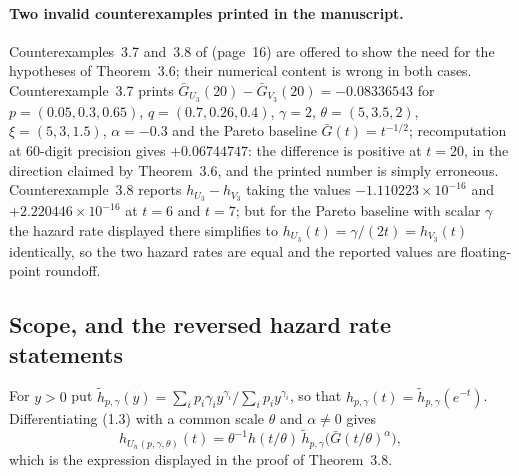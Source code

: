 \documentclass[10pt]{article}
\theoremstyle{plain}
\theoremstyle{definition}
\theoremstyle{remark}
\begin{document}
\paragraph{Two invalid counterexamples printed in the manuscript.} Counterexamples~3.7 and~3.8 of \cite{SahooKayalFinkelstein2026} (page~16) are offered to show the need for the hypotheses of Theorem~3.6; their numerical content is wrong in both cases. Counterexample~3.7 prints $\bar G_{U_3}(20)-\bar G_{V_3}(20)=-0.08336543$ for $p=(0.05,0.3,0.65)$, $q=(0.7,0.26,0.4)$, $\gamma=2$, $\theta=(5,3.5,2)$, $\xi=(5,3,1.5)$, $\alpha=-0.3$ and the Pareto baseline $\bar G(t)=t^{-1/2}$; recomputation at $60$-digit precision gives $+0.06744747$: the difference is positive at $t=20$, in the direction claimed by Theorem~3.6, and the printed number is simply erroneous. Counterexample~3.8 reports $h_{U_3}-h_{V_3}$ taking the values $-1.110223\times10^{-16}$ and $+2.220446\times10^{-16}$ at $t=6$ and $t=7$; but for the Pareto baseline with scalar $\gamma$ the hazard rate displayed there simplifies to $h_{U_3}(t)=\gamma/(2t)=h_{V_3}(t)$ identically, so the two hazard rates are equal and the reported values are floating-point roundoff.

\subsection{Scope, and the reversed hazard rate statements}\label{sec:rh}

For $y>0$ put $\tilde h_{p,\gamma}(y)=\sum_ip_i\gamma_iy^{\gamma_i}/\sum_ip_iy^{\gamma_i}$, so that $h_{p,\gamma}(t)=\tilde h_{p,\gamma}(e^{-t})$. Differentiating (1.3) with a common scale $\theta$ and $\alpha\ne0$ gives
\begin{equation}\label{eq:reduction}
h_{U_n(p,\gamma,\theta)}(t)=\theta^{-1}h(t/\theta)\,\tilde h_{p,\gamma}\bigl(\bar G(t/\theta)^{\alpha}\bigr),
\end{equation}
which is the expression displayed in the proof of Theorem~3.8.
\end{document}
